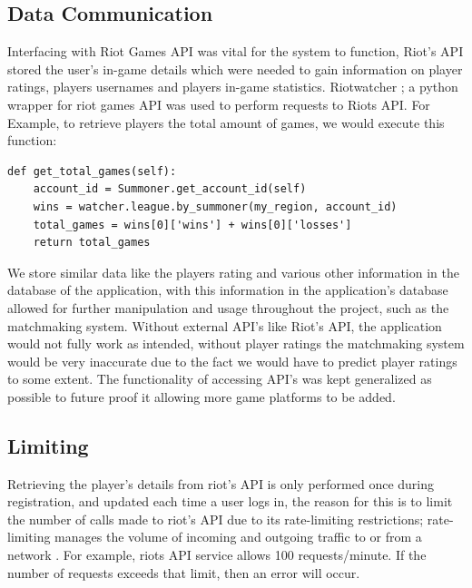 \subsection{Data Communication}
Interfacing with Riot Games API was vital for the system to function, Riot's API stored the user's in-game details which were needed to gain information on player ratings, players usernames and players in-game statistics.\hfill \break 
Riotwatcher \cite{riotwatcher}; a python wrapper for riot games API was used to perform requests to Riots API.\hfill \break
For Example, to retrieve players the total amount of games, we would execute this function:
\begin{verbatim}
def get_total_games(self):
	account_id = Summoner.get_account_id(self)
	wins = watcher.league.by_summoner(my_region, account_id)
	total_games = wins[0]['wins'] + wins[0]['losses']
	return total_games
\end{verbatim}
We store similar data like the players rating and various other information in the database of the application, with this information in the application's database allowed for further manipulation and usage throughout the project, such as the matchmaking system. Without external API's like Riot's API, the application would not fully work as intended, without player ratings the matchmaking system would be very inaccurate due to the fact we would have to predict player ratings to some extent.\hfill \break 
The functionality of accessing API's was kept generalized as possible to future proof it allowing more game platforms to be added.\hfill \break 
\bigskip

\subsection{Limiting}
Retrieving the player's details from riot's API is only performed once during registration, and updated each time a user logs in, the reason for this is to limit the number of calls made to riot's API due to its rate-limiting restrictions; rate-limiting manages the volume of incoming and outgoing traffic to or from a network \cite{raghavan2007cloud}. For example, riots API service allows 100 requests/minute. If the number of requests exceeds that limit, then an error will occur.

\newpage
